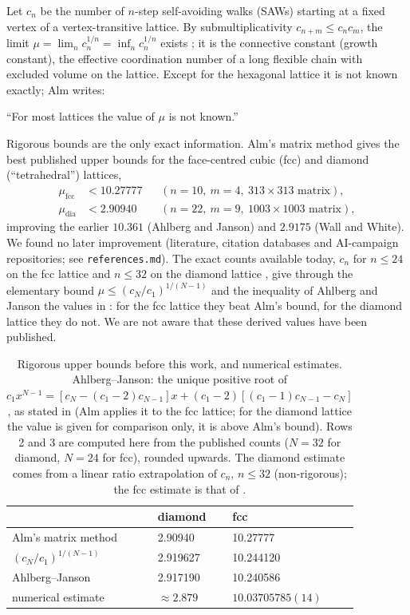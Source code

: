 \documentclass[11pt,a4paper]{report}
\newcommand*{\fcc}{\mathrm{fcc}}
\newcommand*{\dia}{\mathrm{dia}}
\begin{document}
Let \(c_n\) be the number of \(n\)-step self-avoiding walks (SAWs) starting at a fixed vertex of a vertex-transitive
lattice. By submultiplicativity \(c_{n+m}\le c_nc_m\), the limit \(\mu=\lim_n c_n^{1/n}=\inf_n c_n^{1/n}\) exists
\autocite{Hammersley1957}; it is the connective constant (growth constant), the effective coordination number of a
long flexible chain with excluded volume on the lattice. Except for the hexagonal lattice it is not known exactly;
Alm \autocite[116]{Alm1993} writes:
\begin{openquote}
``For most lattices the value of \(\mu\) is not known.''
\end{openquote}
Rigorous bounds are the only exact information. Alm's matrix method \autocite[§6.3.3--6.3.4 and Tables 2, 11,
12]{Alm1993} gives the best published upper bounds for the face-centred cubic (fcc) and diamond (``tetrahedral'')
lattices,
\begin{align*}
\mu_\fcc&<10.27777 &&(n=10,\ m=4,\ 313\times313\text{ matrix}),\\
\mu_\dia&<2.90940 &&(n=22,\ m=9,\ 1003\times1003\text{ matrix}),
\end{align*}
improving the earlier \(10.361\) (Ahlberg and Janson) and \(2.9175\) (Wall and White). We found no later improvement
(literature, citation databases and AI-campaign repositories; see \texttt{references.md}). The exact counts available
today, \(c_n\) for \(n\le24\) on the fcc lattice \autocite{Schram2017,OEIS1336} and \(n\le32\) on the diamond lattice
\autocite{OEIS1394,Guttmann1989}, give through the elementary bound \(\mu\le(c_N/c_1)^{1/(N-1)}\) and the inequality of
Ahlberg and Janson \autocite[(1.6.1)]{MadrasSlade1993} the values in : for the fcc lattice they
beat Alm's bound, for the diamond lattice they do not. We are not aware that these derived values have been published.

\begin{table}[h]
\centering\footnotesize
\caption{Rigorous upper bounds before this work, and numerical estimates. Ahlberg--Janson: the unique positive root
of \(c_1x^{N-1}=[c_N-(c_1-2)c_{N-1}]x+(c_1-2)[(c_1-1)c_{N-1}-c_N]\), as stated in \autocite[(1.6.1)]{MadrasSlade1993}
(Alm \autocite[§6.3.3]{Alm1993} applies it to the fcc lattice; for the diamond lattice the value is given for
comparison only, it is above Alm's bound). Rows 2 and 3 are computed here from the published
counts (\(N=32\) for diamond, \(N=24\) for fcc), rounded upwards. The diamond estimate comes from a linear ratio
extrapolation of \(c_n\), \(n\le32\) (non-rigorous); the fcc estimate is that of \textcite{Clisby2022}.}\label{tab:previous}
\begin{tabular}{@{}lll@{}}
\toprule
 & diamond & fcc \\
\midrule
Alm's matrix method \autocite{Alm1993} & 2.90940 & 10.27777 \\
\((c_N/c_1)^{1/(N-1)}\) & 2.919627 & 10.244120 \\
Ahlberg--Janson & 2.917190 & 10.240586 \\
numerical estimate & \(\approx2.879\) & \(10.03705785(14)\) \\
\bottomrule
\end{tabular}
\end{table}
\end{document}
